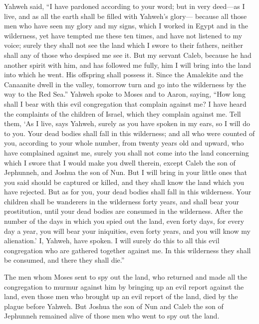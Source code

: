  Yahweh said, ``I have pardoned according to your word;
 but in very deed---as I live, and as all the earth shall
be filled with Yahweh's glory---  because all those men
who have seen my glory and my signs, which I worked in Egypt and in the
wilderness, yet have tempted me these ten times, and have not listened
to my voice;  surely they shall not see the land which I
swore to their fathers, neither shall any of those who despised me see
it.  But my servant Caleb, because he had another spirit
with him, and has followed me fully, him I will bring into the land into
which he went. His offspring shall possess it.  Since the
Amalekite and the Canaanite dwell in the valley, tomorrow turn and go
into the wilderness by the way to the Red Sea.''  Yahweh
spoke to Moses and to Aaron, saying,  ``How long shall I
bear with this evil congregation that complain against me? I have heard
the complaints of the children of Israel, which they complain against
me.  Tell them, `As I live, says Yahweh, surely as you
have spoken in my ears, so I will do to you.  Your dead
bodies shall fall in this wilderness; and all who were counted of you,
according to your whole number, from twenty years old and upward, who
have complained against me,  surely you shall not come
into the land concerning which I swore that I would make you dwell
therein, except Caleb the son of Jephunneh, and Joshua the son of Nun.
 But I will bring in your little ones that you said
should be captured or killed, and they shall know the land which you
have rejected.  But as for you, your dead bodies shall
fall in this wilderness.  Your children shall be
wanderers in the wilderness forty years, and shall bear your
prostitution, until your dead bodies are consumed in the wilderness.
 After the number of the days in which you spied out the
land, even forty days, for every day a year, you will bear your
iniquities, even forty years, and you will know my alienation.'
 I, Yahweh, have spoken. I will surely do this to all
this evil congregation who are gathered together against me. In this
wilderness they shall be consumed, and there they shall die.''

 The men whom Moses sent to spy out the land, who
returned and made all the congregation to murmur against him by bringing
up an evil report against the land,  even those men who
brought up an evil report of the land, died by the plague before Yahweh.
 But Joshua the son of Nun and Caleb the son of Jephunneh
remained alive of those men who went to spy out the land.


